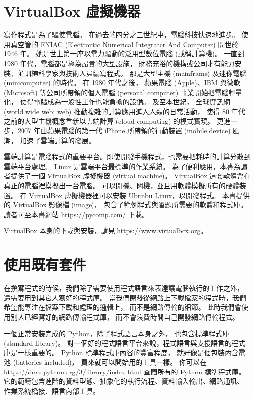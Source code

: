 \documentclass[a4paper,12pt]{book}
\theoremstyle{definition}
\begin{document}
\section{VirtualBox 虛擬機器}
%
\label{c:runtime:vbox}

寫作程式是為了驅使電腦。
在過去的四分之三世紀中，電腦科技快速地進步。
使用真空管的 ENIAC (Electrontic Numerical Integrator And Computer)
問世於 1946 年。
她是世上第一座以電力驅動的泛用型數位電腦 (或稱計算機)。
一直到 1980 年代，電腦都是極為昂貴的大型設施，
財務充裕的機構或公司才有能力安裝，並訓練科學家與技術人員編寫程式。
那是大型主機 (mainframe) 及迷你電腦 (minicomputer) 的時代。
在 1980 年代之後，
蘋果電腦 (Apple)、IBM 與微軟 (Microsoft) 等公司所帶領的個人電腦 (personal computer) 事業開始把電腦輕量化，
使得電腦成為一般性工作也能負擔的設備。
及至本世紀，
全球資訊網 (world wide web; web) 推動複雜的計算應用進入人類的日常活動，
使得 80 年代之前的大型主機概念重新以雲端計算 (cloud computing) 的模式實現。
更進一步，2007 年由蘋果電腦的第一代 iPhone 所帶領的行動裝置 (mobile device) 風潮，
加速了雲端計算的發展。


雲端計算是電腦程式的重要平台。即使開發手機程式，也需要把耗時的計算分散到雲端平台處理。
Linux 是雲端平台最標準的作業系統。
為了便利應用，本書為讀者提供了一個 VirtualBox 虛擬機器 (virtual machine)。
VirtualBox 這套軟體會在真正的電腦裡模擬出一台電腦。
可以開機、關機，並且用軟體模擬所有的硬體裝置。
在 VirtualBox 虛擬機器裡可以安裝 Ubunbu Linux，以開發程式。
本書提供的 VirtualBox 影像檔 (image)，
包含了範例程式與習題所需要的軟體和程式庫。
讀者可至本書網站 \url{https://pycomp.com/} 下載。

VirtualBox 本身的下載與安裝，請見 \url{https://www.virtualbox.org}。

\section{使用既有套件}
%
\label{c:runtime:package}

在撰寫程式的時候，我們除了需要使用程式語言來表達讓電腦執行的工作之外，
還需要用到其它人寫好的程式庫。
當我們開發從網路上下載檔案的程式時，我們希望能專注在檔案下載和處理的邏輯上，
而不是網路傳輸的細節。
此時我們會使用別人已經寫好的網路傳輸程式庫，
而不會浪費時間自己開發網路傳輸程式。

一個正常安裝完成的 Python，除了程式語言本身之外，
也包含標準程式庫 (standard library)。
對一個好的程式語言平台來說，程式語言與支援語言的程式庫是一樣重要的。
Python 標準程式庫內容的豐富程度，
就好像是個包裝內含電池 (batteries-included)，
買來就可以開始用的工具一樣。
你可以在 \url{https://docs.python.org/3/library/index.html}
查閱所有的 Python 標準程式庫。
它的範疇包含進階的資料型態、抽象化的執行流程、資料輸入輸出、網路通訊、
作業系統橋接、語言內部工具。
\end{document}

